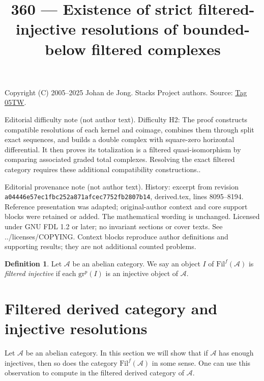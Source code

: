 \documentclass{amsart}
\theoremstyle{plain}
\theoremstyle{definition}
\newtheorem{definition}[subsection]{Definition}
\theoremstyle{remark}
\numberwithin{equation}{subsection}
\begin{document}
\title[Stacks Project, Tag 05TW]{360 --- Existence of strict filtered-injective resolutions of bounded-below filtered complexes}
\maketitle
\noindent Copyright (C) 2005--2025 Johan de Jong. Stacks Project authors. Source: \href{https://stacks.math.columbia.edu/tag/05TW}{Tag 05TW}.

\noindent Editorial difficulty note (not author text). Difficulty H2: The proof constructs compatible resolutions of each kernel and coimage, combines them through split exact sequences, and builds a double complex with square-zero horizontal differential. It then proves its totalization is a filtered quasi-isomorphism by comparing associated graded total complexes. Resolving the exact filtered category requires these additional compatibility constructions..

\noindent Editorial provenance note (not author text). History: excerpt from revision \texttt{a0444\allowbreak 6e57e\allowbreak c1fbc\allowbreak 252a8\allowbreak 71afc\allowbreak ec775\allowbreak 2fb28\allowbreak 07b14}, derived.tex, lines 8095--8194. Reference presentation was adapted; original-author context and core support blocks were retained or added. The mathematical wording is unchanged. Licensed under GNU FDL 1.2 or later; no invariant sections or cover texts. See ../licenses/COPYING. Context blocks reproduce author definitions and supporting results; they are not additional counted problems.

\begin{definition}
\label{definition-filtered-complexes-notation}
Let $\mathcal{A}$ be an abelian category.
We say an object $I$ of $\text{Fil}^f(\mathcal{A})$
is {\it filtered injective} if each $\text{gr}^p(I)$ is
an injective object of $\mathcal{A}$.
\end{definition}

\section{Filtered derived category and injective resolutions}
\label{section-filtered-derived}

\noindent
Let $\mathcal{A}$ be an abelian category. In this section we will show
that if $\mathcal{A}$ has enough injectives, then so does
the category $\text{Fil}^f(\mathcal{A})$ in some sense. One
can use this observation to compute in the filtered derived category
of $\mathcal{A}$.
\end{document}
